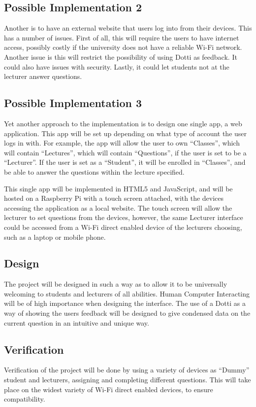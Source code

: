 \documentclass{article}
\begin{document}
\subsection{Possible Implementation 2}
Another is to have an external website that users log into from their devices. This has a number of issues. First of all, this will require the users to have internet access, possibly costly if the university does not have a reliable Wi-Fi network. Another issue is this will restrict the possibility of using Dotti as feedback. It could also have issues with security. Lastly, it could let students not at the lecturer answer questions.

\subsection{Possible Implementation 3}
Yet another approach to the implementation is to design one single app, a web application. This app will be set up depending on what type of account the user logs in with. For example, the app will allow the user to own ``Classes'', which will contain ``Lectures'', which will contain ``Questions'', if the user is set to be a ``Lecturer''. If the user is set as a ``Student'', it will be enrolled in ``Classes'', and be able to answer the questions within the lecture specified.

This single app will be implemented in HTML5 and JavaScript, and will be hosted on a Raspberry Pi with a touch screen attached, with the devices accessing the application as a local website. The touch screen will allow the lecturer to set questions from the devices, however, the same Lecturer interface could be accessed from a Wi-Fi direct enabled device of the lecturers choosing, such as a laptop or mobile phone. 

\subsection{Design}
The project will be designed in such a way as to allow it to be universally welcoming to students and lecturers of all abilities. Human Computer Interacting will be of high importance when designing the interface. The use of a Dotti as a way of showing the users feedback will be designed to give condensed data on the current question in an intuitive and unique way.

\subsection{Verification}
Verification of the project will be done by using a variety of devices as ``Dummy'' student and lecturers, assigning and completing different questions. This will take place on the widest variety of Wi-Fi direct enabled devices, to ensure compatibility. 
\end{document}
